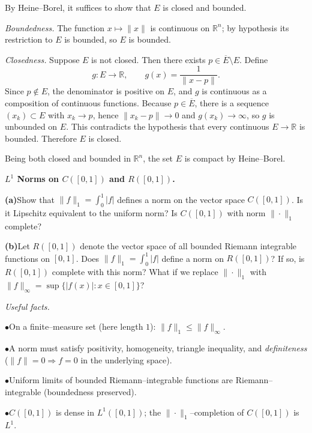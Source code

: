 \begin{solution}
By Heine--Borel, it suffices to show that $E$ is closed and bounded.

\emph{Boundedness.} The function $x\mapsto \|x\|$ is continuous on $\mathbb{R}^n$; by hypothesis
its restriction to $E$ is bounded, so $E$ is bounded.

\emph{Closedness.} Suppose $E$ is not closed. Then there exists $p\in \overline{E}\setminus E$.
Define
\[
g:E\to\mathbb{R},\qquad g(x)=\frac{1}{\|x-p\|}.
\]
Since $p\notin E$, the denominator is positive on $E$, and $g$ is continuous as a composition of
continuous functions. Because $p\in\overline{E}$, there is a sequence $(x_k)\subset E$ with
$x_k\to p$, hence $\|x_k-p\|\to0$ and $g(x_k)\to\infty$, so $g$ is unbounded on $E$.
This contradicts the hypothesis that every continuous $E\to\mathbb{R}$ is bounded. Therefore
$E$ is closed.

Being both closed and bounded in $\mathbb{R}^n$, the set $E$ is compact by Heine--Borel.
\end{solution}

\begin{problem}[CP-II-0131]
\label{prob:cp-ii-0131}
\textbf{\(L^1\) Norms on \(C([0,1])\) and \(R([0,1])\).}

\par\smallskip\hspace*{1.5em}\textbf{(a)}\quad Show that $\|f\|_{1}=\int_{0}^{1}|f|$ defines a norm on the vector space $C([0,1])$.
	Is it Lipschitz equivalent to the uniform norm? Is $C([0,1])$ with norm $\|\cdot\|_{1}$ complete?

	\par\smallskip\noindent\textbf{(b)}\quad Let $R([0,1])$ denote the vector space of all bounded Riemann integrable functions on $[0,1]$.
	Does $\|f\|_{1}=\int_{0}^{1}|f|$ define a norm on $R([0,1])$? If so, is $R([0,1])$ complete with this norm?
	What if we replace $\|\cdot\|_{1}$ with $\|f\|_{\infty}=\sup\{|f(x)|:x\in[0,1]\}$?
\par\medskip\noindent\textit{Useful facts.}

\par\smallskip\noindent\(\bullet\)\quad On a finite--measure set (here length $1$): $\displaystyle \|f\|_{1}\le \|f\|_{\infty}$.

\par\smallskip\noindent\(\bullet\)\quad A norm must satisfy positivity, homogeneity, triangle inequality, and \emph{definiteness}
	($\|f\|=0 \Rightarrow f=0$ in the underlying space).

\par\smallskip\noindent\(\bullet\)\quad Uniform limits of bounded Riemann--integrable functions are Riemann--integrable (boundedness preserved).

\par\smallskip\noindent\(\bullet\)\quad $C([0,1])$ is dense in $L^{1}([0,1])$; the $\|\cdot\|_{1}$--completion of $C([0,1])$ is $L^{1}$.
\end{problem}

